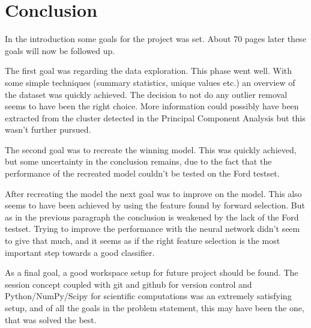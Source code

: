 \chapter{Conclusion}

In the introduction some goals for the project was set. About 70 pages later these goals will now be followed up. \par

The first goal was regarding the data exploration. This phase went well. With some simple techniques (summary statistics, unique values etc.) an overview of the dataset was quickly achieved. The decision to not do any outlier removal seems to have been the right choice. More information could possibly have been extracted from the cluster detected in the Principal Component Analysis but this wasn't further pursued. \par

The second goal was to recreate the winning model. This was quickly achieved, but some uncertainty in the conclusion remains, due to the fact that the performance of the recreated model couldn't be tested on the Ford testset. \par

After recreating the model the next goal was to improve on the model. This also seems to have been achieved by using the feature  found by forward selection. But as in the previous paragraph the conclusion is weakened by the lack of the Ford testset. Trying to improve the performance with the neural network didn't seem to give that much, and it seems as if the right feature selection is the most important step towards a good classifier. \par

As a final goal, a good workspace setup for future project should be found. The session concept coupled with git and github for version control and Python/NumPy/Scipy for scientific computations was an extremely satisfying setup, and of all the goals in the problem statement, this may have been the one, that was solved the best.
